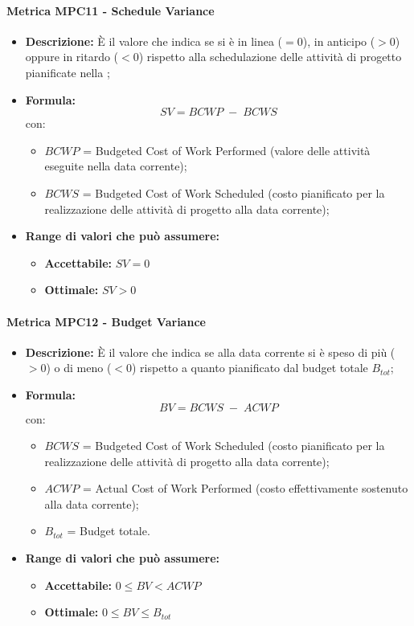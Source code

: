     \paragraph{Metrica MPC11 - Schedule Variance}
    \begin{itemize}
        \item \textbf{Descrizione:} È il valore che indica se si è in linea ($=0$), in anticipo ($>0$) oppure in ritardo ($<0$) rispetto alla schedulazione delle attività di progetto pianificate nella ;
        \item \textbf{Formula:} $$SV = {BCWP \; - \; BCWS}$$
        con:
        \begin{itemize}
            \item $BCWP$ = Budgeted Cost of Work Performed (valore delle attività eseguite nella data corrente);
            \item $BCWS$ = Budgeted Cost of Work Scheduled (costo pianificato per la realizzazione delle attività di progetto alla data corrente);
        \end{itemize}
        \item \textbf{Range di valori che può assumere:}
        \begin{itemize}
            \item \textbf{Accettabile:} $SV = 0$
            \item \textbf{Ottimale:} $SV > 0$
        \end{itemize}
    \end{itemize}

    \paragraph{Metrica MPC12 - Budget Variance}
        \begin{itemize}
            \item \textbf{Descrizione:} È il valore che indica se alla data corrente si è speso di più ($>0$) o di meno ($<0$) rispetto a quanto pianificato dal budget totale $B_{tot}$;
            \item \textbf{Formula:} $$BV = {BCWS \; - \; ACWP}$$
            con:
            \begin{itemize}
                \item $BCWS$ = Budgeted Cost of Work Scheduled (costo pianificato per la realizzazione delle attività di progetto alla data corrente);
                \item $ACWP$ = Actual Cost of Work Performed (costo effettivamente sostenuto alla data corrente);
                \item $B_{tot}$ = Budget totale.
            \end{itemize}
            \item \textbf{Range di valori che può assumere:}
            \begin{itemize}
                \item \textbf{Accettabile:} $0 \leq BV < ACWP$
                \item \textbf{Ottimale:} $0 \leq BV \leq B_{tot}$
            \end{itemize}
        \end{itemize}

